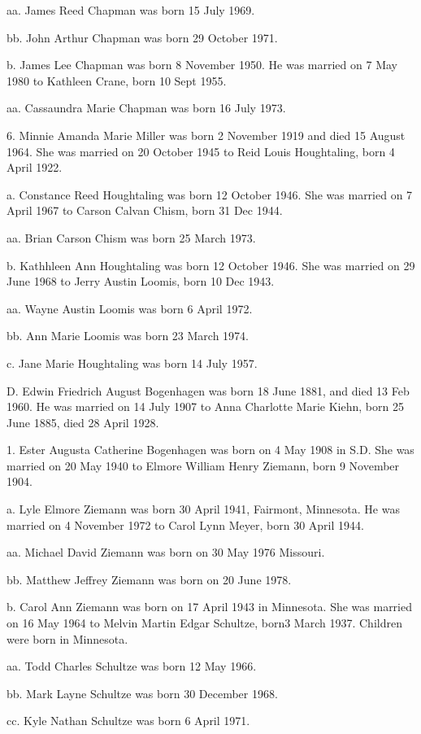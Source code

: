 \documentclass[a4paper]{article}
\begin{document}
aa. James Reed Chapman was born 15 July 1969.

bb. John Arthur Chapman was born 29 October 1971.

b. James Lee Chapman was born 8 November 1950.  He was married on 7 May 1980 to Kathleen Crane, born 10 Sept 1955.
 
aa. Cassaundra Marie Chapman was born 16 July 1973.

6. Minnie Amanda Marie Miller was born 2 November 1919 and died 15 August 1964.  She was married on 20 October 1945 to Reid Louis Houghtaling, born 4 April 1922. 

a. Constance Reed Houghtaling was born 12 October 1946.  She was married on 7 April 1967 to Carson Calvan Chism, born 31 Dec 1944.
 
aa. Brian Carson Chism was born 25 March 1973.

b. Kathhleen Ann Houghtaling was born 12 October 1946.  She was married on 29 June 1968 to Jerry Austin Loomis, born 10 Dec 1943.
 
aa. Wayne Austin Loomis was born 6 April 1972.

bb. Ann Marie Loomis was born 23 March 1974.

c. Jane Marie Houghtaling was born 14 July 1957.  

D. Edwin Friedrich August Bogenhagen was born 18 June 1881, and died 13 Feb 1960. He was married on 14 July 1907 to Anna Charlotte Marie Kiehn, born 25 June 1885, died 28 April 1928.

1. Ester Augusta Catherine Bogenhagen was born on 4 May 1908 in S.D. She was married on 20 May 1940 to Elmore William Henry Ziemann, born 9 November 1904.

a. Lyle Elmore Ziemann was born 30 April 1941, Fairmont, Minnesota. He was married on 4 November 1972 to Carol Lynn Meyer, born 30 April 1944.

aa. Michael David Ziemann was born on 30 May 1976 Missouri.

bb. Matthew Jeffrey Ziemann was born on 20 June 1978.

b. Carol Ann Ziemann was born on 17 April 1943 in Minnesota.  She was married on 16 May 1964 to Melvin Martin Edgar Schultze, born3 March 1937.  Children were born in Minnesota.

aa. Todd Charles Schultze was born 12 May 1966.

bb. Mark Layne Schultze was born 30 December 1968.

cc. Kyle Nathan Schultze was born 6 April 1971.
\end{document}
